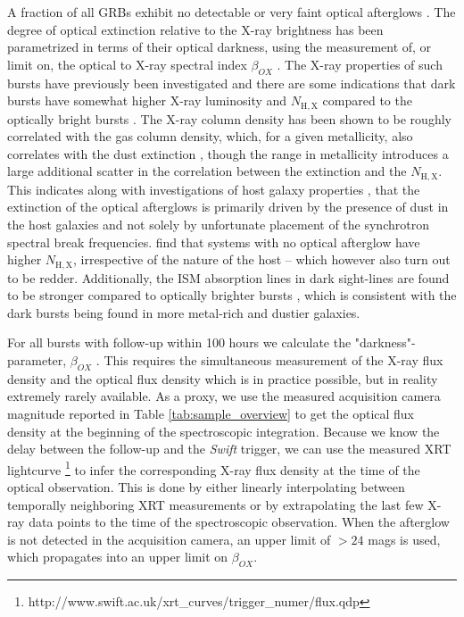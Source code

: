 \documentclass[longauth]{aa}    %
\begin{document}
A fraction of all GRBs exhibit no detectable or very faint optical afterglows
\citep{Groot1998, Djorgovski2001, Fynbo2001}. The degree of optical extinction
relative to the X-ray brightness has been parametrized in terms of their optical
darkness, using the measurement of, or limit on, the optical to X-ray spectral
index $\beta_{OX}$ \citep{Jakobsson2004, Rol2005, VanderHorst2009}. The X-ray
properties of such bursts have previously been investigated
\citep{DePasquale2003, Fynbo2009, Melandri2012} and there are some indications
that dark bursts have somewhat higher X-ray luminosity and $N_{\mathrm{H, X}}$
compared to the optically bright bursts \citep{Campana2012, Watson2012}. The
X-ray column density has been shown to be roughly correlated with the gas column
density, which, for a given metallicity, also correlates with the dust
extinction \citep{Watson2013, Covino2013a}, though the range in metallicity
introduces a large additional scatter in the correlation between the extinction
and the $N_{\mathrm{H, X}}$. This indicates along with investigations of host
galaxy properties \citep{Greiner2011, Kruhler2011, Hjorth2012, Perley2016b},
that the extinction of the optical afterglows is primarily driven by the
presence of dust in the host galaxies and not solely by unfortunate placement of
the synchrotron spectral break frequencies. \citet{Hjorth2012} find that systems
with no optical afterglow have higher $N_{\mathrm{H, X}}$, irrespective of the
nature of the host -- which however also turn out to be redder. Additionally,
the ISM absorption lines in dark sight-lines are found to be stronger compared
to optically brighter bursts \citep{Christensen2011a}, which is consistent with
the dark bursts being found in more metal-rich and dustier galaxies.

For all bursts with follow-up within 100 hours we calculate the
"darkness"-parameter, $\beta_{OX}$ \citep{Jakobsson2004}. This requires the
simultaneous measurement of the X-ray flux density and the optical flux density
which is in practice possible, but in reality extremely rarely available. As
a proxy, we use the measured acquisition camera magnitude reported in Table
\ref{tab:sample_overview} to get the optical flux density at the beginning of
the spectroscopic integration. Because we know the delay between the follow-up
and the \textit{Swift} trigger, we can use the measured XRT lightcurve
\citep{Evans2007,
	Evans2009}\footnote{http://www.swift.ac.uk/xrt\_curves/trigger\_numer/flux.qdp}
to infer the corresponding X-ray flux density at the time of the optical
observation. This is done by either linearly interpolating between temporally
neighboring XRT measurements or by extrapolating the last few X-ray data points
to the time of the spectroscopic observation. When the afterglow is not detected
in the acquisition camera, an upper limit of $> 24$ mags is used, which
propagates into an upper limit on $\beta_{OX}$.
\end{document}
